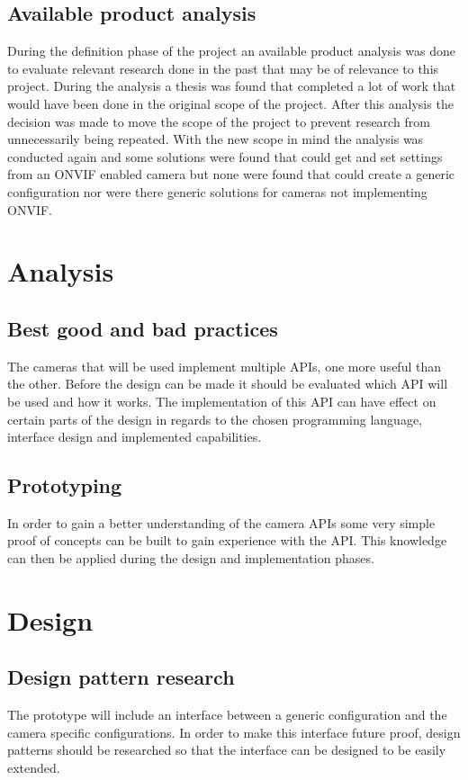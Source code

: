 \documentclass[11pt, a4paper,nomath,nopackage]{siltex-report}
\begin{document}
\subsection{Available product analysis}
During the definition phase of the project an available product analysis was done to evaluate relevant research done in the past that may be of relevance to this
project. During the analysis a thesis \cite{tim_k_onvif} was found that completed a lot of work that would have been done in the original scope of the project. After
this analysis the decision was made to move the scope of the project to prevent research from unnecessarily being repeated. With the new scope in mind the analysis was
conducted again and some solutions were found that could get and set settings from an ONVIF enabled camera but none were found that could create a generic configuration nor
were there generic solutions for cameras not implementing ONVIF.

\section{Analysis}
\subsection{Best good and bad practices}
The cameras that will be used implement multiple APIs, one more useful than the other. Before the design can be made it should be evaluated which API will be used and
how it works. The implementation of this API can have effect on certain parts of the design in regards to the chosen programming language, interface design and
implemented capabilities.

\subsection{Prototyping}
In order to gain a better understanding of the camera APIs some very simple proof of concepts can be built to gain experience with the API. This knowledge can then be applied during the design and implementation phases.

\section{Design}
\subsection{Design pattern research}
The prototype will include an interface between a generic configuration and the camera specific configurations. In order to make this interface future proof, design patterns should be researched so that the interface can be designed to be easily extended.
\end{document}
